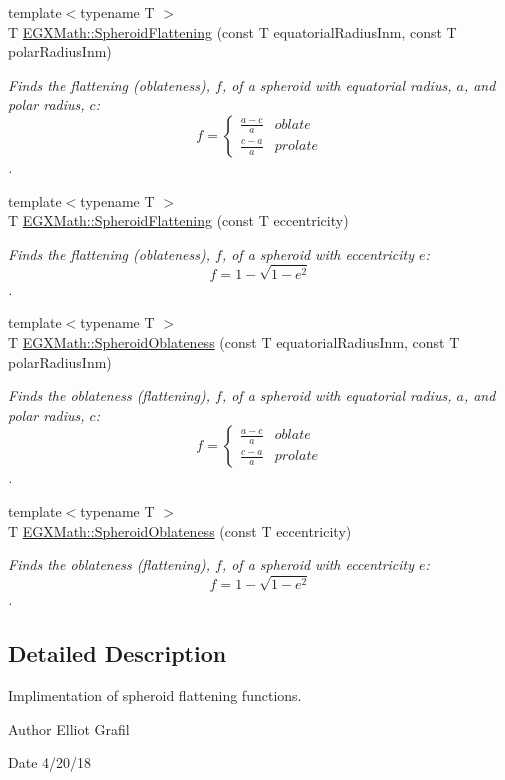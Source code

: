 \begin{DoxyCompactItemize}
\item 
{\footnotesize template$<$typename T $>$ }\\T \mbox{\hyperlink{group___e_g_x_math-_geometry-3_d-_spheroid-_flattening_ga05e3be91f5f7fbaa9371687aa3834179}{E\+G\+X\+Math\+::\+Spheroid\+Flattening}} (const T equatorial\+Radius\+Inm, const T polar\+Radius\+Inm)
\begin{DoxyCompactList}\small\item\em Finds the flattening (oblateness), $f$, of a spheroid with equatorial radius, $a$, and polar radius, $c$\+: \[ f =\begin{cases} \frac{a-c}{a}{} & oblate \\ \frac{c-a}{a} & prolate \end{cases} \]. \end{DoxyCompactList}\item 
{\footnotesize template$<$typename T $>$ }\\T \mbox{\hyperlink{group___e_g_x_math-_geometry-3_d-_spheroid-_flattening_ga9822b6e1025edbf7d272949547c53511}{E\+G\+X\+Math\+::\+Spheroid\+Flattening}} (const T eccentricity)
\begin{DoxyCompactList}\small\item\em Finds the flattening (oblateness), $f$, of a spheroid with eccentricity $e$\+: \[ f = 1 - \sqrt{1-e^2} \]. \end{DoxyCompactList}\item 
{\footnotesize template$<$typename T $>$ }\\T \mbox{\hyperlink{group___e_g_x_math-_geometry-3_d-_spheroid-_flattening_ga9769747e144e2209b7927632b854c31f}{E\+G\+X\+Math\+::\+Spheroid\+Oblateness}} (const T equatorial\+Radius\+Inm, const T polar\+Radius\+Inm)
\begin{DoxyCompactList}\small\item\em Finds the oblateness (flattening), $f$, of a spheroid with equatorial radius, $a$, and polar radius, $c$\+: \[ f =\begin{cases} \frac{a-c}{a}{} & oblate \\ \frac{c-a}{a} & prolate \end{cases} \]. \end{DoxyCompactList}\item 
{\footnotesize template$<$typename T $>$ }\\T \mbox{\hyperlink{group___e_g_x_math-_geometry-3_d-_spheroid-_flattening_ga486adfc58b047197daf87f50b2039ca7}{E\+G\+X\+Math\+::\+Spheroid\+Oblateness}} (const T eccentricity)
\begin{DoxyCompactList}\small\item\em Finds the oblateness (flattening), $f$, of a spheroid with eccentricity $e$\+: \[ f = 1 - \sqrt{1-e^2} \]. \end{DoxyCompactList}\end{DoxyCompactItemize}


\subsection{Detailed Description}
Implimentation of spheroid flattening functions. 

\begin{DoxyAuthor}{Author}
Elliot Grafil 
\end{DoxyAuthor}
\begin{DoxyDate}{Date}
4/20/18 
\end{DoxyDate}
